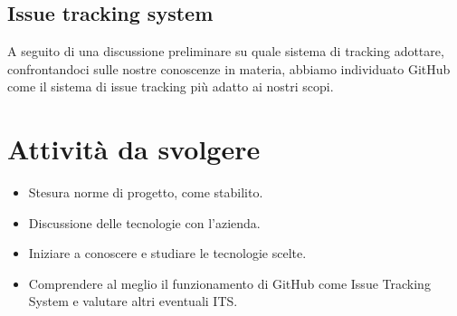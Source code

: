 \documentclass[10pt]{article}
\begin{document}
    \subsection{Issue tracking system}
    A seguito di una discussione preliminare su quale sistema di tracking adottare, confrontandoci sulle nostre conoscenze in materia, abbiamo individuato GitHub come il sistema di issue tracking più adatto ai nostri scopi.
    \section{Attività da svolgere}
    \begin{itemize}
        \item Stesura norme di progetto, come stabilito.
        \item Discussione delle tecnologie con l'azienda.
        \item Iniziare a conoscere e studiare le tecnologie scelte.
        \item Comprendere al meglio il funzionamento di GitHub come Issue Tracking System e valutare altri eventuali ITS.
         
    \end{itemize}
    

     
\end{document}
